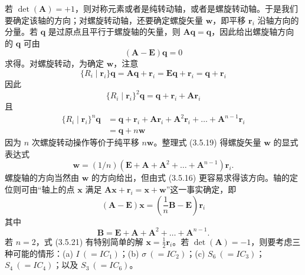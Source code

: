若 $\det(\mathbf{A}) = +1$，则对称元素或者是纯转动轴，或者是螺旋转动轴。于是我们要确定该轴的方向；对螺旋转动轴，还要确定螺旋矢量 $\mathbf{w}$，即平移 $\mathbf{r}_{i}$ 沿轴方向的分量。若 $\mathbf{q}$ 是过原点且平行于螺旋轴的矢量，则 $\mathbf{A}\mathbf{q} = \mathbf{q}$，因此给出螺旋轴方向的 $\mathbf{q}$ 可由
\begin{equation*}
(\mathbf{A} - \mathbf{E})\mathbf{q} = 0
\tag{3.5.16}
\end{equation*}
求得。对螺旋转动，为确定 $\mathbf{w}$，注意
\begin{equation*}
\{R_{i} \mid \mathbf{r}_{i}\}\mathbf{q} = \mathbf{A}\mathbf{q} + \mathbf{r}_{i} = \mathbf{E}\mathbf{q} + \mathbf{r}_{i} = \mathbf{q} + \mathbf{r}_{i}
\tag{3.5.17}
\end{equation*}
因此
\begin{equation*}
\{R_{i} \mid \mathbf{r}_{i}\}^{2}\mathbf{q} = \mathbf{q} + \mathbf{r}_{i} + \mathbf{A}\mathbf{r}_{i}
\tag{3.5.18}
\end{equation*}
且
\begin{equation*}
\begin{aligned}
\{R_{i} \mid \mathbf{r}_{i}\}^{n}\mathbf{q} &= \mathbf{q} + \mathbf{r}_{i} + \mathbf{A}\mathbf{r}_{i} + \mathbf{A}^{2}\mathbf{r}_{i} + \dots + \mathbf{A}^{n-1}\mathbf{r}_{i}\\
&= \mathbf{q} + n\mathbf{w}
\end{aligned}
\tag{3.5.19}
\end{equation*}
因为 $n$ 次螺旋转动操作等价于纯平移 $n\mathbf{w}$。整理式 (3.5.19) 得螺旋矢量 $\mathbf{w}$ 的显式表达式
\begin{equation*}
\mathbf{w} = (1/n)(\mathbf{E} + \mathbf{A} + \mathbf{A}^{2} + \dots + \mathbf{A}^{n-1})\mathbf{r}_{i}.
\tag{3.5.20}
\end{equation*}
螺旋轴的方向当然由 $\mathbf{w}$ 的方向给出，但由式 (3.5.16) 更容易求得该方向。轴的定位则可由“轴上的点 $\mathbf{x}$ 满足 $\mathbf{A}\mathbf{x} + \mathbf{r}_{i} = \mathbf{x} + \mathbf{w}$”这一事实确定，即
\begin{equation*}
(\mathbf{A} - \mathbf{E})\mathbf{x} = \left(\frac{1}{n}\mathbf{B} - \mathbf{E}\right)\mathbf{r}_{i}
\tag{3.5.21}
\end{equation*}
其中
\begin{equation*}
\mathbf{B} = \mathbf{E} + \mathbf{A} + \mathbf{A}^{2} + \dots + \mathbf{A}^{n-1}.
\tag{3.5.22}
\end{equation*}
若 $n = 2$，式 (3.5.21) 有特别简单的解 $\mathbf{x} = \frac{1}{2}\mathbf{r}_{i}$。若 $\det(\mathbf{A}) = -1$，则要考虑三种可能的情形：(a) $I\ ( = IC_{1})$；(b) $\sigma\ ( = IC_{2})$；(c) $S_{6}\ ( = IC_{3})$；$S_{4}\ ( = IC_{4})$；以及 $S_{3}\ ( = IC_{6})$。


